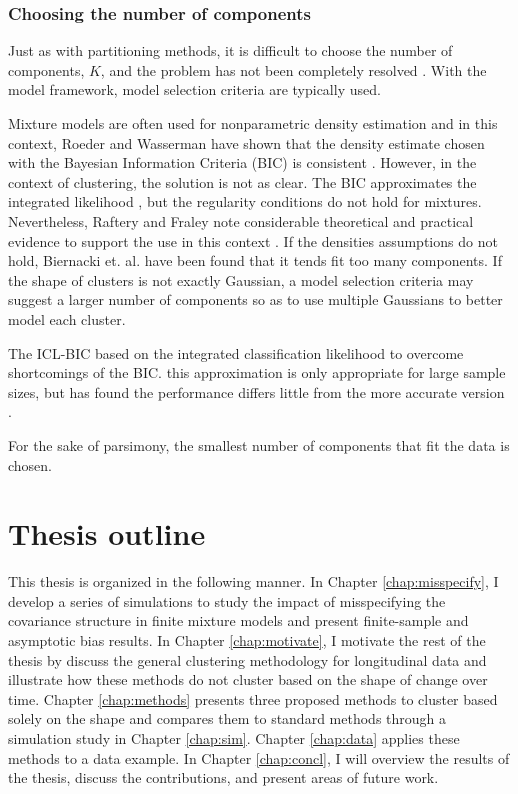 \subsubsection{Choosing the number of components}
Just as with partitioning methods, it is difficult to choose the number of components, $K$, and the problem has not been completely resolved \cite{mclachlan2000}. With the model framework, model selection criteria are typically used.

Mixture models are often used for nonparametric density estimation and in this context, Roeder and Wasserman have shown that the density estimate chosen with the Bayesian Information Criteria (BIC) is consistent \cite{roeder1997}. However, in the context of clustering, the solution is not as clear. The BIC approximates the integrated likelihood \cite{schwarz1978}, but the regularity conditions do not hold for mixtures. Nevertheless, Raftery and Fraley note considerable theoretical and practical evidence to support the use in this context \cite{fraley1998}. If the densities assumptions do not hold, Biernacki et. al. \cite{biernacki2000} have been found that it tends fit too many components. If the shape of clusters is not exactly Gaussian, a model selection criteria may suggest a larger number of components so as to use multiple Gaussians to better model each cluster. 

The ICL-BIC based on the integrated classification likelihood to overcome shortcomings of the BIC. this approximation is only appropriate for large sample sizes, but has found the performance differs little from the more accurate version \cite{biernacki2000}.

For the sake of parsimony, the smallest number of components that fit the data is chosen.

\section{Thesis outline}
This thesis is organized in the following manner. In Chapter \ref{chap:misspecify}, I develop a series of simulations to study the impact of misspecifying the covariance structure in finite mixture models and present finite-sample and asymptotic bias results. In Chapter \ref{chap:motivate}, I motivate the rest of the thesis by discuss the general clustering methodology for longitudinal data and illustrate how these methods do not cluster based on the shape of change over time. Chapter \ref{chap:methods} presents three proposed methods to cluster based solely on the shape and compares them to standard methods through a simulation study in Chapter \ref{chap:sim}. Chapter \ref{chap:data} applies these methods to a data example. In Chapter \ref{chap:concl}, I will overview the results of the thesis, discuss the contributions, and present areas of future work. 

